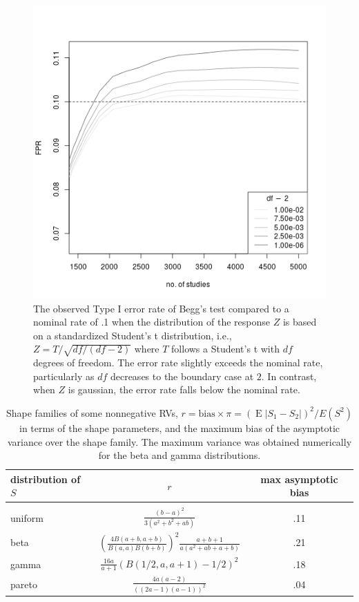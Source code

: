 \documentclass[12pt]{article}
\newcommand{\biasratio}{r}%
\DeclareMathOperator{\E}{E}
\begin{document}
\begin{figure}
  \centering
  \includegraphics[width=\linewidth/2]{neg_bias_students.png}
  \caption{The observed Type I error rate of Begg's test compared to a
    nominal rate of .1 when the distribution of the response $Z$ is
    based on a standardized Student's t distribution, i.e.,
    $Z=T/\sqrt{df/(df-2)}$ where $T$ follows a Student's t with $df$
    degrees of freedom. The error rate slightly exceeds the nominal
    rate, particularly as $df$ decreases to the boundary case at
    $2$. In contrast, when $Z$ is gaussian, the error rate falls below
    the nominal rate.}
  \label{fig:negative bias}
\end{figure}

\begin{table}
    \begin{tabular}{l c c}
    distribution of $S$ & $\biasratio$ & max asymptotic bias \\
    \hline\\
    uniform  & $\frac{(b-a)^2}{3(a^2+b^2+ab)}$  & .11\\
    beta & $\left(\frac{4B(a+b,a+b)}{B(a,a)B(b+b)}\right)^2\frac{a+b+1}{a(a^2+ab+a+b)}$ & .21\\
    gamma & $\frac{16a}{a+1}(B(1/2,a,a+1)-1/2)^2$ & .18\\
    pareto & $\frac{4a(a-2)}{((2a-1)(a-1))^2}$ & .04\\
  \end{tabular}
  \caption{Shape families of some nonnegative RVs,
    $\biasratio=\text{bias}\times\pi=(\E|S_1-S_2|)^2/E(S^2)$ in terms
    of the shape parameters, and the maximum bias of the asymptotic
    variance over the shape family. The maximum variance was obtained
    numerically for the beta and gamma distributions.}
  \label{table:biasratio}
\end{table}
\end{document}
